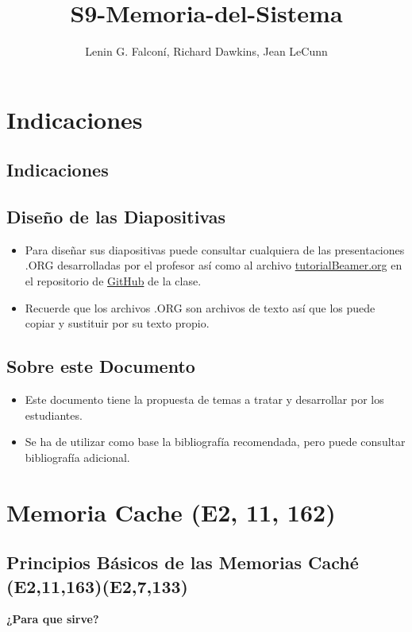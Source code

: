 \documentclass[presentation]{beamer}
\author{Lenin G. Falconí, Richard Dawkins, Jean LeCunn}
\date{}
\title{S9-Memoria-del-Sistema}
\begin{document}
\maketitle
\tableofcontents



\section{Indicaciones}
\label{sec:orgae5bc0c}
\subsection{Indicaciones}
\label{sec:org23ada82}
\subsection{Diseño de las Diapositivas}
\label{sec:org60704b1}
\begin{itemize}
\item Para diseñar sus diapositivas puede consultar cualquiera de las
presentaciones .ORG desarrolladas por el profesor así como al
archivo \href{https://github.com/LeninGF/EPN-Lectures/blob/main/iccd332ArqComp-2024-B/Tutoriales/Beamer-Emacs/tutorialBeamer.org}{tutorialBeamer.org} en el repositorio de \href{https://github.com/LeninGF/EPN-Lectures/blob/main/iccd332ArqComp-2024-B/Tutoriales/Beamer-Emacs/tutorialBeamer.org}{GitHub} de la clase.
\item Recuerde que los archivos .ORG son archivos de texto así que los
puede copiar y sustituir por su texto propio.
\end{itemize}
\subsection{Sobre este Documento}
\label{sec:orgc4bfac1}
\begin{itemize}
\item Este documento tiene la propuesta de temas a tratar y desarrollar
por los estudiantes.
\item Se ha de utilizar como base la bibliografía recomendada, pero puede
consultar bibliografía adicional.
\end{itemize}
\section{Memoria Cache (E2, 11, 162)}
\label{sec:org5c2d986}
\subsection{Principios Básicos de las Memorias Caché (E2,11,163)(E2,7,133)}
\label{sec:orgf150a23}
\textbf{\textbf{\textbf{¿Para que sirve?}}} 
\end{document}
